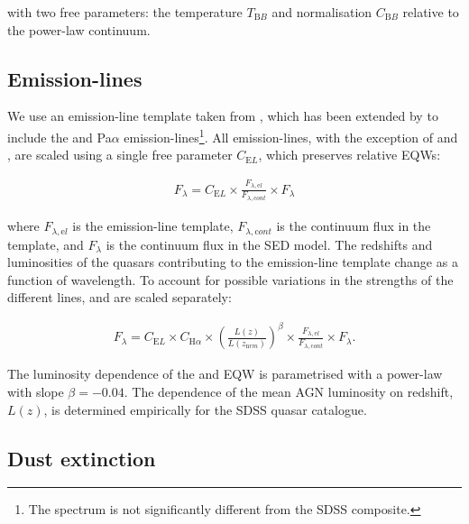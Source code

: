 with two free parameters: the temperature $T_{\mathrm BB}$ and normalisation $C_{\mathrm BB}$ relative to the power-law continuum. 

\subsection{Emission-lines}

We use an emission-line template taken from \citet{francis91}, which has been extended by \citet{maddox06} to include the \ha and Pa$\alpha$ emission-lines\footnote{The spectrum is not significantly different from the \citet{vandenberk01} SDSS composite.}. 
All emission-lines, with the exception of \ha and \hbns, are scaled using a single free parameter $C_{\mathrm EL}$, which preserves relative EQWs:

\begin{eqnarray}
  F_{\lambda} =  C_{\mathrm EL} \times \frac{F_{\lambda, \mathrm el}}{F_{\lambda, \mathrm cont}} \times F_{\lambda} 
\end{eqnarray} 

where $F_{\lambda, \mathrm el}$ is the emission-line template, $F_{\lambda,\mathrm cont}$ is the continuum flux in the template, and $F_{\lambda}$ is the continuum flux in the SED model.
The redshifts and luminosities of the quasars contributing to the emission-line template change as a function of wavelength. 
To account for possible variations in the strengths of the different lines, \ha and \hb are scaled separately: 

\begin{eqnarray}
  F_{\lambda} =  C_{\mathrm EL} \times C_{{\mathrm H} \alpha} \times \left( \frac{L(z)} {L(z_{\mathrm nrm})} \right)^{\beta} \times \frac{F_{\lambda, \mathrm el}}{F_{\lambda, \mathrm cont}} \times F_{\lambda}.
\end{eqnarray}

The luminosity dependence of the \ha and \hb EQW \citep[i.e. the Baldwin effect;][]{baldwin77} is parametrised with a power-law with slope $\beta=-0.04$.
The dependence of the mean AGN luminosity on redshift, $L(z)$, is determined empirically for the SDSS quasar catalogue. 

\subsection{Dust extinction}
\label{sec:sed-extinction} 

